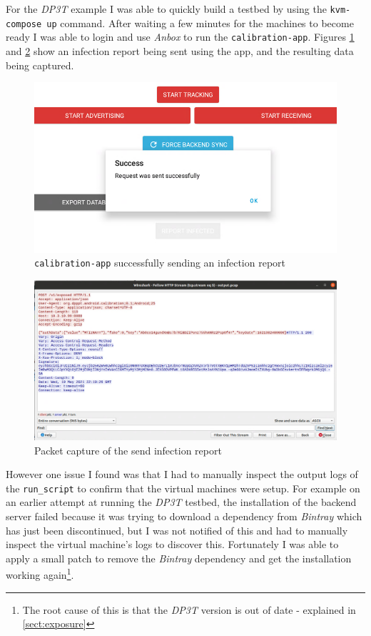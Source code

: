 \documentclass[
    author={Jacob Daniel Halsey},
    supervisor={Prof. Awais Rashid},
    degree={BSc},
    title={Building a Testbed for Evaluating Privacy Enhancing Technologies  (PETs)},
    subtitle={},
    type={software development},
    year={2021}
]{dissertation}
\begin{document}
For the \emph{DP3T} example I was able to quickly build a testbed by using the
\texttt{kvm-compose up} command. After waiting a few minutes for the machines to become ready
I was able to login and use \emph{Anbox} to run the \texttt{calibration-app}. Figures
\ref{fig:successfully} and \ref{fig:dp3t_capture} show an infection report being sent using the
app, and the resulting data being captured. \\

\begin{figure}
	\centering
	\includegraphics[width=12cm]{img/successfully}
	\caption{\texttt{calibration-app} successfully sending an infection report}
	\label{fig:successfully}
\end{figure}

\begin{figure}
	\centering
	\includegraphics[width=16cm]{img/dp3t_capture}
	\caption{Packet capture of the send infection report}
	\label{fig:dp3t_capture}
\end{figure}

However one issue I found was that I had to manually inspect the output logs of the \texttt{run\_script}
to confirm that the virtual machines were setup. 
For example on an earlier attempt at running the \emph{DP3T} testbed, the installation of the backend server
failed because it was trying to download a dependency from \emph{Bintray} which has just been
discontinued, but I was not notified of this and had to manually inspect the virtual machine's
logs to discover this. Fortunately I was able to apply a small patch to remove the \emph{Bintray}
dependency and get the installation working again\footnote{The root cause of this is that
the \emph{DP3T} version is out of date - explained in \ref{sect:exposure}}. \\
\end{document}
